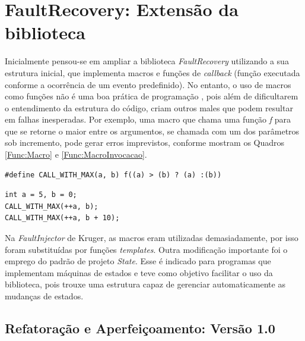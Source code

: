 \section{FaultRecovery: Extensão da biblioteca} \label{sec:extensaoBiblioteca}

Inicialmente pensou-se em ampliar a biblioteca \textit{FaultRecovery} utilizando a sua estrutura inicial, que implementa macros e funções de \textit{callback} (função executada conforme a ocorrência de um evento predefinido). No entanto, o uso de macros como funções não é uma boa prática de programação \cite{Meyers:2011}, pois além de dificultarem o entendimento da estrutura do código, criam outros males que podem resultar em falhas inesperadas. Por exemplo, uma macro que chama uma função \textit{f} para que se retorne o maior entre os argumentos, se chamada com um dos parâmetros sob incremento, pode gerar erros imprevistos, conforme mostram os Quadros \ref{Func:Macro} e \ref{Func:MacroInvocacao}.

\begin{lstlisting}[label=Func:Macro,caption={[Uso de macro como função] Macro que chama \textit{f} como o máximo entre a e b}]
#define CALL_WITH_MAX(a, b) f((a) > (b) ? (a) :(b))
\end{lstlisting}

\begin{lstlisting}[label=Func:MacroInvocacao,caption={[Macro sendo chamada no código] Na primeira invocação da macro a variável a é incrementada duas vezes e na segunda uma vez.}]
int a = 5, b = 0;
CALL_WITH_MAX(++a, b);
CALL_WITH_MAX(++a, b + 10);
\end{lstlisting}


Na \textit{FaultInjector} de Kruger, as macros eram utilizadas demasiadamente, por isso foram substituídas por funções \textit{templates}. Outra modificação importante foi o emprego do padrão de projeto \textit{State}. Esse é indicado para programas que implementam máquinas de estados e teve como objetivo facilitar o uso da biblioteca, pois trouxe uma estrutura capaz de gerenciar automaticamente as mudanças de estados.

\subsection{Refatoração e Aperfeiçoamento: Versão 1.0} \label{subsec:versao1}

